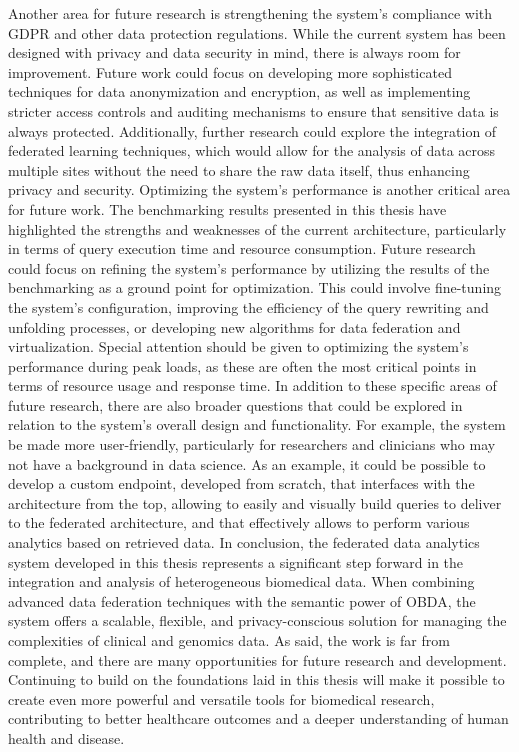Another area for future research is strengthening the system's compliance with \ac{GDPR} and other data protection regulations. While the current system has been designed with privacy and data security in mind, there is always room for improvement. Future work could focus on developing more sophisticated techniques for data anonymization and encryption, as well as implementing stricter access controls and auditing mechanisms to ensure that sensitive data is always protected. Additionally, further research could explore the integration of federated learning techniques, which would allow for the analysis of data across multiple sites without the need to share the raw data itself, thus enhancing privacy and security.
Optimizing the system's performance is another critical area for future work. The benchmarking results presented in this thesis have highlighted the strengths and weaknesses of the current architecture, particularly in terms of query execution time and resource consumption. Future research could focus on refining the system's performance by utilizing the results of the benchmarking as a ground point for optimization. This could involve fine-tuning the system's configuration, improving the efficiency of the query rewriting and unfolding processes, or developing new algorithms for data federation and virtualization. Special attention should be given to optimizing the system's performance during peak loads, as these are often the most critical points in terms of resource usage and response time.
In addition to these specific areas of future research, there are also broader questions that could be explored in relation to the system's overall design and functionality. For example, the system be made more user-friendly, particularly for researchers and clinicians who may not have a background in data science. As an example, it could be possible to develop a custom endpoint, developed from scratch, that interfaces with the architecture from the top, allowing to easily and visually build queries to deliver to the federated architecture, and that effectively allows to perform various analytics based on retrieved data.
In conclusion, the federated data analytics system developed in this thesis represents a significant step forward in the integration and analysis of heterogeneous biomedical data. When combining advanced data federation techniques with the semantic power of \ac{OBDA}, the system offers a scalable, flexible, and privacy-conscious solution for managing the complexities of clinical and genomics data. As said, the work is far from complete, and there are many opportunities for future research and development. Continuing to build on the foundations laid in this thesis will make it possible to create even more powerful and versatile tools for biomedical research, contributing to better healthcare outcomes and a deeper understanding of human health and disease.
